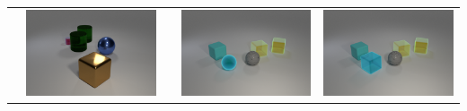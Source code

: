 \begin{table}
\begin{tabular}{@{}ccccc@{}}
\begin{minipage}{.2\textwidth}
    \end{minipage}
    &
    \begin{minipage}{.2\textwidth}
      \includegraphics[width=\linewidth]{figures/clevr_datasets/CLEVRA_examples/train_shape4.png}
    \end{minipage}
    &&
    \begin{minipage}{.2\textwidth}
      \includegraphics[width=\linewidth]{figures/clevr_datasets/CLEVRA_examples/test4.png}
    \end{minipage}
    &
        \begin{minipage}{.2\textwidth}
      \includegraphics[width=\linewidth]{figures/clevr_datasets/CLEVRA_examples/test_shape4.png}

\end{minipage}
\end{tabular}
\end{table}
